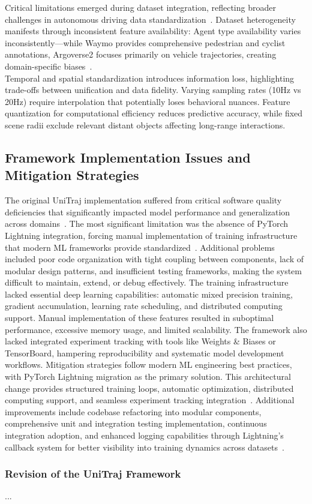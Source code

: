 Critical limitations emerged during dataset integration, reflecting broader challenges in autonomous driving data standardization~\cite{hu2023planning}. Dataset heterogeneity manifests through inconsistent feature availability: Agent type availability varies inconsistently—while Waymo provides comprehensive pedestrian and cyclist annotations, Argoverse2 focuses primarily on vehicle trajectories, creating domain-specific biases~\cite{unitrajFeng2024}.\\
Temporal and spatial standardization introduces information loss, highlighting trade-offs between unification and data fidelity. Varying sampling rates (10Hz vs 20Hz) require interpolation that potentially loses behavioral nuances. Feature quantization for computational efficiency reduces predictive accuracy, while fixed scene radii exclude relevant distant objects affecting long-range interactions.

\subsection{Framework Implementation Issues and Mitigation Strategies}
\label{ssec:framework_issues}

The original UniTraj implementation suffered from critical software quality deficiencies that significantly impacted model performance and generalization across domains~\cite{metadriveLi2022}. The most significant limitation was the absence of PyTorch Lightning integration, forcing manual implementation of training infrastructure that modern ML frameworks provide standardized~\cite{falcon2019pytorch}. Additional problems included poor code organization with tight coupling between components, lack of modular design patterns, and insufficient testing frameworks, making the system difficult to maintain, extend, or debug effectively.
The training infrastructure lacked essential deep learning capabilities: automatic mixed precision training, gradient accumulation, learning rate scheduling, and distributed computing support. Manual implementation of these features resulted in suboptimal performance, excessive memory usage, and limited scalability. The framework also lacked integrated experiment tracking with tools like Weights \& Biases or TensorBoard, hampering reproducibility and systematic model development workflows.
Mitigation strategies follow modern ML engineering best practices, with PyTorch Lightning migration as the primary solution. This architectural change provides structured training loops, automatic optimization, distributed computing support, and seamless experiment tracking integration~\cite{falcon2019pytorch}. Additional improvements include codebase refactoring into modular components, comprehensive unit and integration testing implementation, continuous integration adoption, and enhanced logging capabilities through Lightning's callback system for better visibility into training dynamics across datasets~\cite{unitrajFeng2024, scenarionetLi2023}.


\subsubsection{Revision of the UniTraj Framework}
...